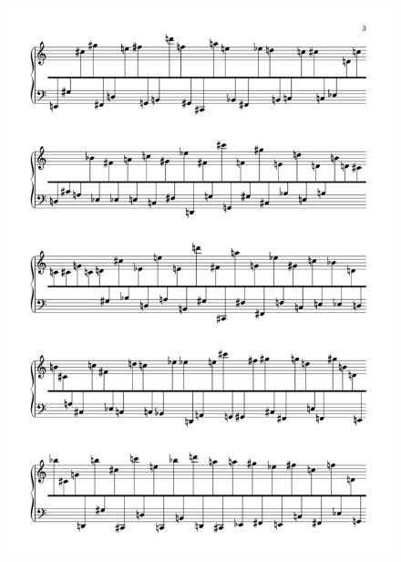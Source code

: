  \begin{figure}[H]
\begin{center}
\includegraphics[width=\textwidth]{mp/img/a-2.png}
\end{center}
\end{figure}

